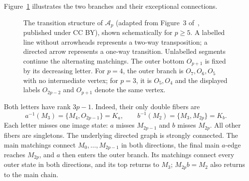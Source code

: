 \documentclass[11pt]{article}
\newcommand{\M}[1]{M_{#1}}
\newcommand{\Ost}[1]{O_{#1}}
\newcommand{\pair}[2]{\{#1,#2\}}
\begin{document}
Figure~\ref{fig:automaton} illustrates the two branches and their exceptional connections.

\begin{figure}[ht]
\centering
\caption{The transition structure of $\mathcal A_p$ (adapted from Figure~3 of~\cite{szykula}, published under CC BY), shown schematically for $p\geq5$. A labelled line without arrowheads represents a two-way transposition; a directed arrow represents a one-way transition. Unlabelled segments continue the alternating matchings. The outer bottom $O_{p+1}$ is fixed by its decreasing letter. For $p=4$, the outer branch is $O_7,O_6,O_5$ with no intermediate vertex; for $p=3$, it is $O_5,O_4$ and the displayed labels $O_{2p-2}$ and $O_{p+1}$ denote the same vertex.}\label{fig:automaton}
\end{figure}

Both letters have rank $3p-1$. Indeed, their only double fibers are
\begin{equation}\label{eq:kernels}
 a^{-1}(\M3)=\pair{\M4}{\Ost{2p-1}}=K_a,
 \qquad b^{-1}(\M2)=\pair{\M3}{\M{2p}}=K_b.
\end{equation}
Each letter misses one image state: $a$ misses $\M{2p-1}$ and $b$ misses $\M{2p}$. All other fibers are singletons.
The underlying directed graph is strongly connected. The main matchings connect $\M0,\ldots,\M{2p-1}$ in both directions, the final main $a$-edge reaches $\M{2p}$, and $a$ then enters the outer branch. Its matchings connect every outer state in both directions, and its top returns to $\M3$; $\M{2p}b=\M2$ also returns to the main chain.
\end{document}
